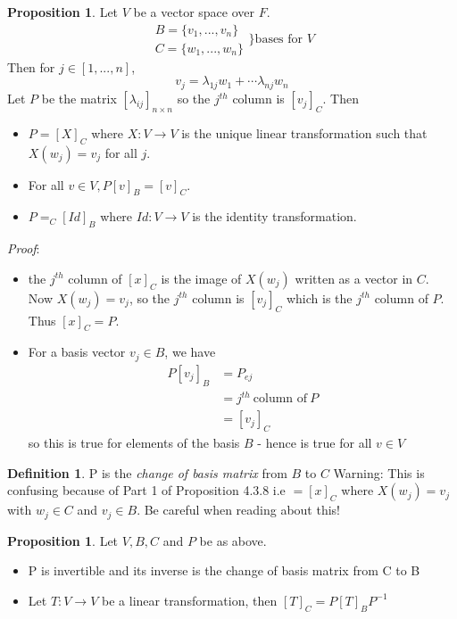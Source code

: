 \documentclass{report}
\theoremstyle{remark}
\theoremstyle{definition}
\newtheorem{definition}[theorem]{Definition}
\theoremstyle{definition}
\theoremstyle{theorem}
\newtheorem{proposition}[theorem]{Proposition}
\begin{document}
\begin{proposition}
Let $V$ be a vector space over $F$. 
\[ \begin{array}{c}
    B=\{v_1, ..., v_n\}\\
    C=\{w_1,...,w_n\}
\end{array} \bigg\} \text{bases for }V\]
Then for $j \in [1,...,n]$,
\[v_j=\lambda_{1j}w_1+\cdots\lambda_{nj}w_n\]
Let $P$ be the matrix $[\lambda_{ij}]_{n \times n}$ so the $j^{th}$ column is $[v_j]_C$. Then
\begin{itemize}
    \item $P=[X]_C$ where $X:V \rightarrow V$ is the unique linear transformation such that $X(w_j)=v_j$ for all $j$.
    \item For all $v \in V, P[v]_B=[v]_C$.
    \item $P = _C[Id]_B$ where $Id:V \rightarrow V$ is the identity transformation.
\end{itemize}
\end{proposition}
\emph{Proof}:
\begin{itemize}
    \item the $j^{th}$ column of $[x]_C$ is the image of $X(w_j)$ written as a vector in $C$. Now $X(w_j)=v_j$, so the $j^{th}$ column is $[v_j]_C$ which is the $j^{th}$ column of $P$. Thus $[x]_C=P$.
    \item For a basis vector $v_j \in B$, we have \begin{align*}
        P[v_j]_B&=P_{ej}\\
        &= j^{th} \> \text{column of} \> P\\
        &= [v_j]_C
    \end{align*}
    so this is true for elements of the basis $B$ - hence is true for all $v \in V$
\end{itemize}
\begin{definition}
P is the \emph{change of basis matrix} from $B$ to $C$
Warning: This is confusing because of Part 1 of Proposition 4.3.8 i.e $= [x]_C$ where $X(w_j)=v_j$ with $w_j \in C$ and $v_j \in B$. Be careful when reading about this!
\end{definition}
\begin{proposition}
Let $V,B,C$ and $P$ be as above.
\begin{itemize}
    \item P is invertible and its inverse is the change of basis matrix from C to B
    \item Let $T:V \rightarrow V$ be a linear transformation, then $[T]_C = P[T]_BP^{-1}$
\end{itemize}
\end{proposition}
\end{document}
